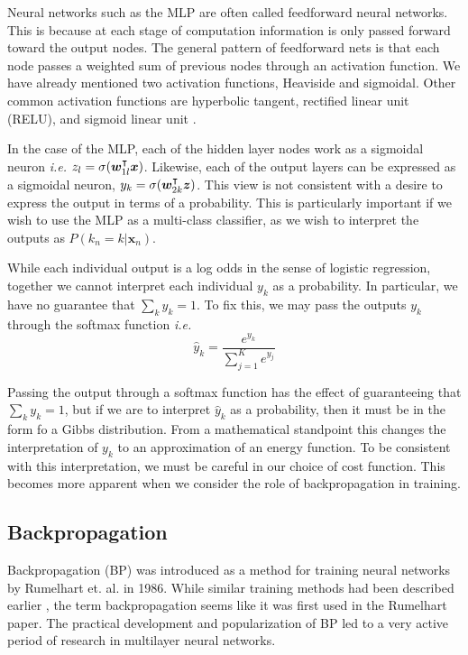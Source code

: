 

Neural networks such as the MLP are often called feedforward neural networks.  This is because at each stage of computation information is only passed forward toward the output nodes.  The general pattern of feedforward nets is that each node passes a weighted sum of previous nodes through an activation function.  We have already mentioned two activation functions, Heaviside and sigmoidal. Other common activation functions are hyperbolic tangent, rectified linear unit (RELU), and sigmoid linear unit \cite{elfwingSiLU}.

In the case of the MLP, each of the hidden layer nodes work as a sigmoidal neuron \textit{i.e.} \( z_l = \sigma(\bm w_{1l}^{\intercal}\bm x) \). Likewise, each of the output layers can be expressed as a sigmoidal neuron, \( y_k = \sigma(\bm w_{2k}^{\intercal}\bm z) \). This view is not consistent with a desire to express the output in terms of a probability. This is particularly important if we wish to use the MLP as a multi-class classifier, as we wish to interpret the outputs as \( P(k_n=k|\bm x_n) \).

While each individual output is a log odds in the sense of logistic regression, together we cannot interpret each individual \( y_k \)  as a probability.  In particular, we have no guarantee that \( \sum_k y_k=1 \).  To fix this, we may pass the outputs \( y_k \) through the softmax function \textit{i.e.} 
\begin{equation}\label{MLPsoftmax}
\hat{y}_k = \frac{e^{y_k}}{\sum_{j=1}^{K} e^{y_j}}
\end{equation}

Passing the output through a softmax function has the effect of guaranteeing that \( \sum_k y_k=1 \), but if we are to interpret \( \hat{y}_k \) as a probability, then it must be in the form fo a Gibbs distribution.  From a mathematical standpoint this changes the interpretation of \( y_k \) to an approximation of an energy function.  To be consistent with this interpretation, we must be careful in our choice of cost function.  This becomes more apparent when we consider the role of backpropagation in training.

\subsection{Backpropagation}\label{subsect:backprop}
Backpropagation (BP) was introduced as a method for training neural networks by Rumelhart et. al. \cite{rumelhart1986learning} in 1986.  While similar training methods had been described earlier \cite[see ch6.6]{Goodfellow-et-al-2016}, the term backpropagation seems like it was first used in the Rumelhart paper.  The practical development and popularization of BP led to a very active period of research in multilayer neural networks.

